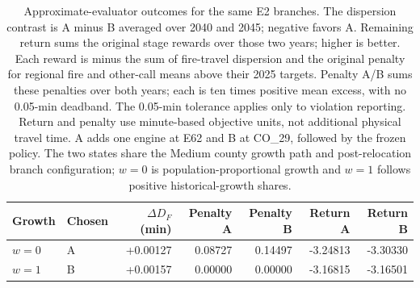 \begin{table}[htbp]
\centering
\small
\caption{Approximate-evaluator outcomes for the same E2 branches. The dispersion contrast is A minus B averaged over 2040 and 2045; negative favors A. Remaining return sums the original stage rewards over those two years; higher is better. Each reward is minus the sum of fire-travel dispersion and the original penalty for regional fire and other-call means above their 2025 targets. Penalty A/B sums these penalties over both years; each is ten times positive mean excess, with no 0.05-min deadband. The 0.05-min tolerance applies only to violation reporting. Return and penalty use minute-based objective units, not additional physical travel time. A adds one engine at E62 and B at CO\_29, followed by the frozen policy. The two states share the Medium county growth path and post-relocation branch configuration; $w=0$ is population-proportional growth and $w=1$ follows positive historical-growth shares.}
\label{tab:e2_fast_objective}
\setlength{\tabcolsep}{4pt}
\begin{tabular}{llrrrrr}
\toprule
Growth & Chosen & $\Delta D_F$ (min) & Penalty A & Penalty B & Return A & Return B \\
\midrule
$w=0$ & A & +0.00127 & 0.08727 & 0.14497 & -3.24813 & -3.30330 \\
$w=1$ & B & +0.00157 & 0.00000 & 0.00000 & -3.16815 & -3.16501 \\
\bottomrule
\end{tabular}
\end{table}
